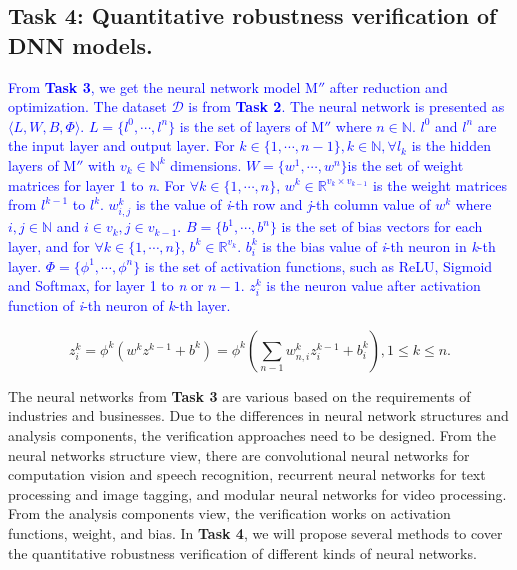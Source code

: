 \subsection{Task 4: Quantitative robustness verification of DNN models.}
\textcolor{blue}{From \textbf{Task 3}, we get the neural network model $\mathrm{M}''$ after reduction and optimization. The dataset $\mathcal{D}$ is from \textbf{Task 2}. The neural network is presented as $\langle L,W,B,\Phi \rangle$. $L=\lbrace l^{0},\dotsm,l^{n} \rbrace$ is the set of layers of $\mathrm{M}''$ where $n\in \mathbb{N}$. $l^{0}$ and $l^{n}$ are the input layer and output layer. 
For $k\in\lbrace1, \dotsm,n-1\rbrace, k\in\mathbb{N}, \forall{l_{k}}$ is the hidden layers of $\mathrm{M}''$ with $v_k\in\mathbb{N}^{k}$ dimensions. 
$W=\lbrace w^{1}, \dotsm, w^{n}\rbrace$is the set of weight matrices for layer 1 to \emph{n}. For $\forall k\in\lbrace 1,\dotsm,n\rbrace$, $w^{k} \in \mathbb{R}^{v_k \times v_{k-1}}$ is the weight matrices from $l^{k-1}$ to $l^k$. $w^k_{i,j}$ is the value of \emph{i}-th row and \emph{j}-th column value of $w^k$ where $i,j \in \mathbb{N}$ and $i\in v_k, j\in v_{k-1}$.
$B=\lbrace b^{1}, \dotsm, b^{n} \rbrace$ is the set of bias vectors for each layer, and for $\forall k\in\lbrace 1,\dotsm,n\rbrace$, $b^{k} \in \mathbb{R}^{v_k}$. $b_i^{k}$ is the bias value of \emph{i}-th neuron in \emph{k}-th layer.
$\Phi=\lbrace \phi^{1}, \dotsm, \phi^{n}\rbrace$ is the set of activation functions, such as ReLU, Sigmoid and Softmax, for layer 1 to \emph{n} or $n-1$. 
$z^k_i$ is the neuron value after activation function of \emph{i}-th neuron of \emph{k}-th layer.
}

\begin{equation}
    z^{k}_i=\phi^{k}(w^kz^{k-1}+b^k) = \phi^{k}(\sum_{n-1}w^{k}_{n,i}z^{k-1}_i + b^{k}_{i}), 1 \leq k \leq n.
\end{equation}

The neural networks from \textbf{Task 3} are various based on the requirements of industries and businesses. Due to the differences in neural network structures and analysis components, the verification approaches need to be designed. From the neural networks structure view, there are convolutional neural networks for computation vision and speech recognition, recurrent neural networks for text processing and image tagging, and modular neural networks for video processing. From the analysis components view, the verification works on activation functions, weight, and bias. In \textbf{Task 4}, we will propose several methods to cover the quantitative robustness verification of different kinds of neural networks.

